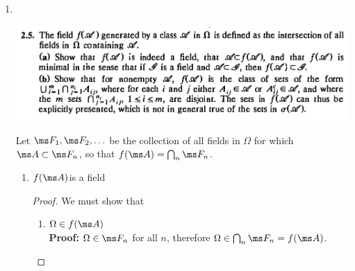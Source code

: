 \begin{enumerate}
\begin{enumerate}[label=(\alph*)]
\begin{proof}
      But $\{1\}$ is not a dyadic interval, therefore there is no $n$ for which $\{1\} \in \ms A_n$.
      Furthermore there is no $n$ for which $\{1\} \in \sigma(\ms A_n)$ (justification below).

      Therefore $\{1\} \notin \bigcup_{n=1}^\infty \ms F_n$ and so $\bigcup_{n=1}^\infty \ms F_n$ is not a $\sigma$-algebra.

      ~\\
      \textbf{Justification that there is no $n$ for which $\{1\} \in \sigma(\ms A_n)$:}

      By definition, $\sigma(\ms A_n)$ is the intersection of all $\sigma$-algebras that include $\ms A_n$.
      Suppose $\{1\} \in \sigma(\ms A_n)$. Now form a new class of sets $\sigma^*(\ms A_n)$ by removing
      from $\sigma(\ms A_n)$ every set that contains $1$ as an isolated point, and its complement. We claim
      that $\sigma^*(\ms A_n)$ is a $\sigma$-algebra. Note that none of the removed sets were in $\ms A_n$
      (since they are not dyadic intervals). But
      then $\ms A_n \subseteq \sigma^*(\ms A_n) \subset \sigma(\ms A_n)$ which contradicts the definition
      of $\sigma(\ms A_n)$. Therefore $\{1\} \notin \sigma(\ms A_n)$.
    \end{proof}
  \end{enumerate}

\newpage
\item~\\
  \begin{mdframed}
    \includegraphics[width=400pt]{img/analysis--berkeley-202a-hw-ab18.png}
  \end{mdframed}
  Let $\ms F_1, \ms F_2, \ldots$ be the collection of all fields in $\Omega$ for which $\ms A \subset \ms F_n$,
  so that $f(\ms A) = \bigcap_{n}\ms F_n$.

  \begin{enumerate}[label=(\alph*)]

  \item
    \begin{claim*}
      $f(\ms A)$is a field
    \end{claim*}
    \begin{proof}
      We must show that
      \begin{enumerate}
      \item $\Omega \in f(\ms A)$\\
        {\bf Proof:} $\Omega \in \ms F_n$ for all $n$, therefore $\Omega \in \bigcap_{n}\ms F_n = f(\ms A)$.


\end{enumerate}
\end{proof}
\end{enumerate}
\end{enumerate}
